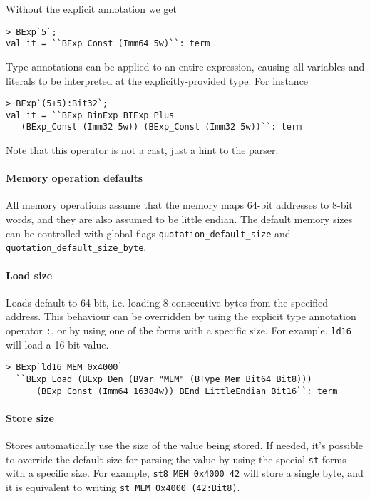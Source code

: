 \documentclass{article}
\begin{document}
Without the explicit annotation we get

\begin{verbatim}
> BExp`5`;
val it = ``BExp_Const (Imm64 5w)``: term
\end{verbatim}

Type annotations can be applied to an entire expression, causing all variables
and literals to be interpreted at the explicitly-provided type. For instance

\begin{verbatim}
> BExp`(5+5):Bit32`;
val it = ``BExp_BinExp BIExp_Plus
   (BExp_Const (Imm32 5w)) (BExp_Const (Imm32 5w))``: term
\end{verbatim}


Note that this operator is not a cast, just a hint to the parser.

\paragraph{Memory operation defaults} All memory operations assume that the
memory maps 64-bit addresses to 8-bit words, and they are also assumed to be
little endian. The default memory sizes can be controlled with global flags
\texttt{quotation_default_size} and
\texttt{quotation_default_size_byte}.

\paragraph{Load size} Loads default to 64-bit, i.e. loading 8 consecutive bytes
from the specified address. This behaviour can be overridden by using the
explicit type annotation operator \texttt{:}, or by using one of the forms with
a specific size. For example, \texttt{ld16} will load a 16-bit value.

\begin{verbatim}
> BExp`ld16 MEM 0x4000`
  ``BExp_Load (BExp_Den (BVar "MEM" (BType_Mem Bit64 Bit8)))
      (BExp_Const (Imm64 16384w)) BEnd_LittleEndian Bit16``: term
\end{verbatim}

\paragraph{Store size}
Stores automatically use the size of the value being stored. If needed, it's
possible to override the default size for parsing the value by using the special
\texttt{st} forms with a specific size. For example, \texttt{st8 MEM 0x4000 42}
will store a single byte, and it is equivalent to writing \texttt{st MEM 0x4000
  (42:Bit8)}.
\end{document}
